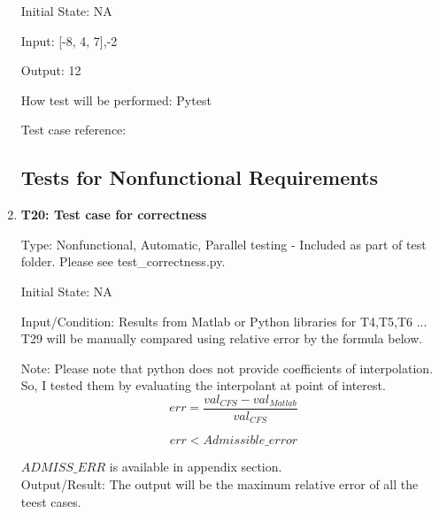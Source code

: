 \documentclass[12pt, titlepage]{article}
\begin{document}
\begin{enumerate}
Initial State: NA

Input: [-8, 4, 7],-2

Output: 12

How test will be performed: Pytest

Test case reference: \cite{RegAugmented}\\



\subsection{Tests for Nonfunctional Requirements}\label{NFRTesting}



\item{\textbf{T20: Test case for correctness}\\}

Type: Nonfunctional, Automatic, Parallel testing - Included as part of test 
folder. Please see test\_correctness.py.
					
Initial State: NA
					
Input/Condition: Results from Matlab or Python libraries for T4,T5,T6 ... T29 
will be manually compared using relative error by the formula below. 

Note: Please note that python does not provide coefficients of interpolation. 
So, I tested them by evaluating the interpolant at point of interest.
\begin{equation*}
err = \frac{val_{CFS} - val_{Matlab}}{val_{CFS}}
\end{equation*}

\begin{equation*}
err < Admissible\_error
\end{equation*}


$ADMISS\_ERR$ is available in appendix section.  \\
				
Output/Result: The output will be the maximum relative error of all the teest 
cases.
					

\end{enumerate}
\end{document}
